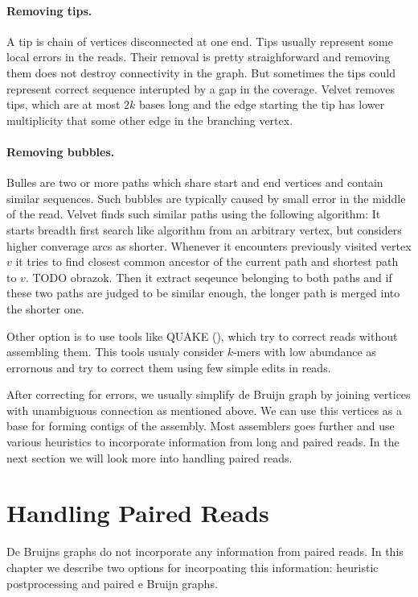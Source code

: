 \paragraph{Removing tips.} A tip is chain of vertices disconnected at one end. 
Tips usually represent some local errors in the reads. Their removal is pretty straighforward
and removing them does not destroy connectivity in the graph. But sometimes the tips
could represent correct sequence interupted by a gap in the coverage.
Velvet \citep{Velvet} removes tips, which are at most $2k$ bases long and the edge starting
the tip has lower multiplicity that some other edge in the branching vertex.

\paragraph{Removing bubbles.} Bulles are two or more paths which share start and end vertices
and contain similar sequences.
Such bubbles are typically caused by small error in the middle of the read.
Velvet finds such similar paths using the following algorithm:
It starts breadth first search like algorithm from an arbitrary vertex, but considers higher converage
arcs as shorter. Whenever it encounters previously visited vertex $v$ it tries to find closest common ancestor
of the current path and shortest path to $v$. TODO obrazok. Then it extract seqeunce belonging to both paths and
if these two paths are judged to be similar enough, the longer path is merged into the shorter one. 
 
\bigskip

Other option is to use tools like QUAKE (\cite{Quake}), which try to correct reads
without assembling them. This tools usualy consider $k$-mers with low abundance
as errornous and try to correct them using few simple edits in reads.

After correcting for errors, we usually simplify de Bruijn graph by joining vertices
with unambiguous connection as mentioned above. 
We can use this vertices as a base for forming contigs of the assembly.
Most assemblers goes further and use various heuristics
to incorporate information from long and paired reads.
In the next section we will look more into handling paired reads.

\section{Handling Paired Reads}

De Bruijns graphs do not incorporate any information from paired reads.
In this chapter we describe two options for incorpoating this information:
heuristic postprocessing and paired e Bruijn graphs.

